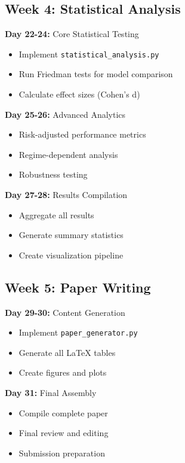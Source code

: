 \documentclass[11pt]{article}
\begin{document}
\subsection{Week 4: Statistical Analysis}

\textbf{Day 22-24:} Core Statistical Testing
\begin{itemize}
    \item Implement \texttt{statistical\_analysis.py}
    \item Run Friedman tests for model comparison
    \item Calculate effect sizes (Cohen's d)
\end{itemize}

\textbf{Day 25-26:} Advanced Analytics
\begin{itemize}
    \item Risk-adjusted performance metrics
    \item Regime-dependent analysis
    \item Robustness testing
\end{itemize}

\textbf{Day 27-28:} Results Compilation
\begin{itemize}
    \item Aggregate all results
    \item Generate summary statistics
    \item Create visualization pipeline
\end{itemize}

\subsection{Week 5: Paper Writing}

\textbf{Day 29-30:} Content Generation
\begin{itemize}
    \item Implement \texttt{paper\_generator.py}
    \item Generate all LaTeX tables
    \item Create figures and plots
\end{itemize}

\textbf{Day 31:} Final Assembly
\begin{itemize}
    \item Compile complete paper
    \item Final review and editing
    \item Submission preparation
\end{itemize}
\end{document}
